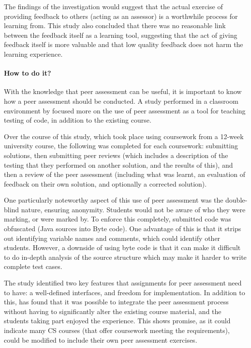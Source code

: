 \documentclass[sigplan,10pt,review]{acmart}\settopmatter{printfolios=true}
\begin{document}
The findings of the investigation would suggest that the actual
exercise of providing feedback to others (acting as an assessor) is a
worthwhile process for learning from. This study also concluded that
there was no reasonable link between the feedback itself as a learning
tool, suggesting that the act of giving feedback itself is more
valuable and that low quality feedback does not harm the learning
experience.

\paragraph{How to do it?}

With the knowledge that peer assessment can be useful, it is important
to know how a peer assessment should be conducted. A study performed
in a classroom environment by \citet{smith_using_2012}
focused more on the use of peer assessment as a tool for teaching
testing of code, in addition to the existing course.

Over the course of this study, which took place using coursework from
a 12-week university course, the following was completed for each
coursework: submitting solutions, then submitting peer reviews (which
includes a description of the testing that they performed on another
solution, and the results of this), and then a review of the peer
assessment (including what was learnt, an evaluation of feedback on
their own solution, and optionally a corrected solution).

One particularly noteworthy aspect of this use of peer assessment was
the double-blind nature, ensuring anonymity. Students would not be
aware of who they were marking, or were marked by. To enforce this
completely, submitted code was obfuscated (Java sources into Byte
code). One advantage of this is that it strips out identifying
variable names and comments, which could identify other
students. However, a downside of using byte code is that it can make
it difficult to do in-depth analysis of the source structure which may
make it harder to write complete test cases.

The study identified two key features that assignments for peer
assessment need to have: a well-defined interfaces, and freedom for
implementation.  In addition to this, \citet{smith_using_2012} has
found that it was possible to integrate the peer assessment process
without having to significantly alter the existing course material,
and the students taking part enjoyed the experience. This shows
promise, as it could indicate many \ac{CS} courses (that
offer coursework meeting the requirements), could be modified to
include their own peer assessment exercises.
\end{document}
